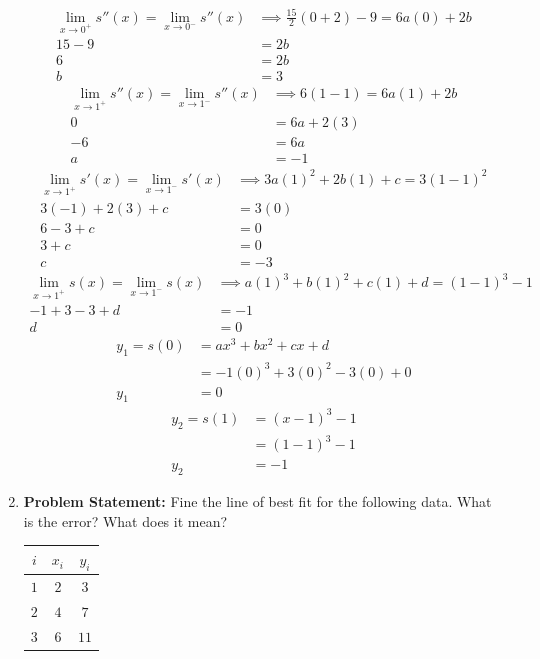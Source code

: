 \documentclass[12pt,twoside]{amsart}
\begin{document}
\begin{enumerate}
    \begin{align*}
    \underset{x \rightarrow 0^+}\lim{s''(x)} = \underset{x \rightarrow 0^-}\lim{s''(x)} & \implies \frac{15}{2}(0 + 2) - 9 = 6a(0) + 2b \\
    15 - 9 & = 2b \\
    6 & = 2b \\
    b & = 3
    \end{align*}
    \begin{align*}
    \underset{x \rightarrow 1^+}\lim{s''(x)} = \underset{x \rightarrow 1^-}\lim{s''(x)} & \implies 6(1 - 1) = 6a(1) + 2b\\
    0 & = 6a + 2(3) \\
    -6 & = 6a \\
    a & = -1
    \end{align*}
    \begin{align*}
    \underset{x \rightarrow 1^+}\lim{s'(x)} = \underset{x \rightarrow 1^-}\lim{s'(x)} & \implies 3a(1)^2 + 2b(1) + c = 3(1 - 1)^2 \\
    3(-1) + 2(3) + c & = 3(0) \\
    6 - 3 + c & = 0 \\
    3 + c & = 0 \\
    c & = -3
    \end{align*}
    \begin{align*}
        \underset{x \rightarrow 1^+}\lim{s(x)} = \underset{x \rightarrow 1^-}\lim{s(x)} & \implies a(1)^3 + b(1)^2 + c(1) + d = (1 - 1)^3 - 1 \\
        -1 + 3 - 3 + d & = -1 \\
        d & = 0
    \end{align*}
    \begin{align*}
    y_1 = s(0) & = ax^3 + bx^2 + cx + d \\
    & = -1(0)^3 + 3(0)^2 - 3(0) + 0 \\
    y_1 & = 0
    \end{align*}
    \begin{align*}
    y_2 = s(1) & = (x - 1)^3 - 1 \\
    & = (1 - 1)^3 - 1 \\
    y_2 & = -1
    \end{align*}
    \bigskip

    \item\textbf{Problem Statement:} Fine the line of best fit for the following data. What is the error? What does it mean? \\
    \begin{center}
    \begin{tabular}{|c||c|c|}
        \hline
        $i$ & $x_i$ & $y_i$ \\
        \hline
        $1$ & $2$ & $3$ \\
        \hline
        $2$ & $4$ & $7$ \\
        \hline
        $3$ & $6$ & $11$ \\
        \hline
    \end{tabular}
    \end{center}


\end{enumerate}
\end{document}
